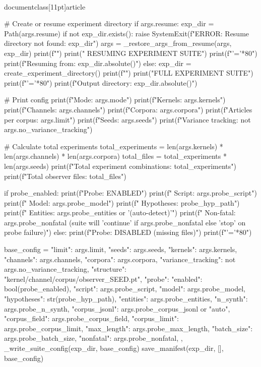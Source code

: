 \\documentclass[11pt]{article}
\begin{document}
\begin{CodeBlock}
    # Create or resume experiment directory
    if args.resume:
        exp_dir = Path(args.resume)
        if not exp_dir.exists():
            raise SystemExit(f"ERROR: Resume directory not found: {exp_dir}")
        args = _restore_args_from_resume(args, exp_dir)
        print(f"")
        print(" RESUMING EXPERIMENT SUITE")
        print(f"{'='*80}")
        print(f"Resuming from: {exp_dir.absolute()}")
    else:
        exp_dir = create_experiment_directory()
        print(f"")
        print("FULL EXPERIMENT SUITE")
        print(f"{'='*80}")
        print(f"Output directory: {exp_dir.absolute()}")

    # Print config
    print(f"Mode: {args.mode}")
    print(f"Kernels: {args.kernels}")
    print(f"Channels: {args.channels}")
    print(f"Corpora: {args.corpora}")
    print(f"Articles per corpus: {args.limit}")
    print(f"Seeds: {args.seeds}")
    print(f"Variance tracking: {not args.no_variance_tracking}")
    
    # Calculate total experiments
    total_experiments = len(args.kernels) * len(args.channels) * len(args.corpora)
    total_files = total_experiments * len(args.seeds)
    print(f"Total experiment combinations: {total_experiments}")
    print(f"Total observer files: {total_files}")
    
    if probe_enabled:
        print(f"Probe: ENABLED")
        print(f"  Script: {args.probe_script}")
        print(f"  Model: {args.probe_model}")
        print(f"  Hypotheses: {probe_hyp_path}")
        print(f"  Entities: {args.probe_entities or '(auto-detect)'}")
        print(f"  Non-fatal: {args.probe_nonfatal} (suite will {'continue' if args.probe_nonfatal else 'stop'} on probe failure)")
    else:
        print(f"Probe: DISABLED (missing files)")
    print(f"{'='*80}")

    base_config = {
        "limit": args.limit,
        "seeds": args.seeds,
        "kernels": args.kernels,
        "channels": args.channels,
        "corpora": args.corpora,
        "variance_tracking": not args.no_variance_tracking,
        "structure": "kernel/channel/corpus/observer_SEED.pt",
        "probe": {
            "enabled": bool(probe_enabled),
            "script": args.probe_script,
            "model": args.probe_model,
            "hypotheses": str(probe_hyp_path),
            "entities": args.probe_entities,
            "n_synth": args.probe_n_synth,
            "corpus_jsonl": args.probe_corpus_jsonl or "auto",
            "corpus_field": args.probe_corpus_field,
            "corpus_limit": args.probe_corpus_limit,
            "max_length": args.probe_max_length,
            "batch_size": args.probe_batch_size,
            "nonfatal": args.probe_nonfatal,
        },
    }
    _write_suite_config(exp_dir, base_config)
    save_manifest(exp_dir, [], base_config)


\end{CodeBlock}
\end{document}
